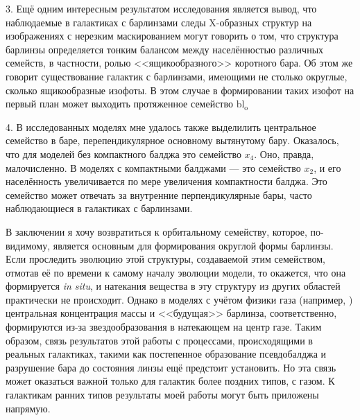 \documentclass{trlnotes}
\begin{document}
3. Ещё одним интересным результатом исследования является вывод, что наблюдаемые в галактиках с барлинзами следы X-образных структур на изображениях с нерезким маскированием могут говорить о том, что структура барлинзы определяется тонким балансом между населённостью различных семейств, в частности, ролью <<ящикообразного>> коротного бара. Об этом же говорит существование галактик с барлинзами, имеющими не столько округлые, сколько ящикообразные изофоты. В этом случае в формировании таких изофот на первый план может выходить протяженное семейство $\text{bl}_{\text{o}}$

4. В исследованных моделях мне удалось также выделилить центральное семейство в баре, перепендикулярное основному вытянутому бару. Оказалось, что для моделей без компактного балджа это семейство $x_4$. Оно, правда, малочисленно. В моделях с компактными балджами --- это семейство $x_2$, и его населённость увеличивается по мере увеличения компактности балджа. Это семейство может отвечать за внутренние перпендикулярные бары, часто наблюдающиеся в галактиках с барлинзами.

В заключении я хочу возвратиться к орбитальному семейству, которое, по-видимому, является основным для формирования округлой формы барлинзы. 
Если проследить эволюцию этой структуры, создаваемой этим семейством, отмотав её по времени к самому началу эволюции модели, то окажется, что она формируется \emph{in situ}, и натекания вещества в эту структуру из других областей практически не происходит. Однако в моделях с учётом физики газа (например, \cite{athanassoula2015}) центральная концентрация массы и <<будущая>> барлинза, соответственно, формируются из-за 
звездообразования в натекающем на центр газе. Таким образом, связь результатов этой работы с процессами, происходящими в реальных галактиках, такими
как постепенное образование псевдобалджа и разрушение бара до состояния линзы \citep{combes2011} ещё предстоит установить. Но эта связь может оказаться важной только для галактик более поздних типов, с газом. К галактикам ранних типов результаты моей работы могут быть приложены напрямую.
 
\end{document}
